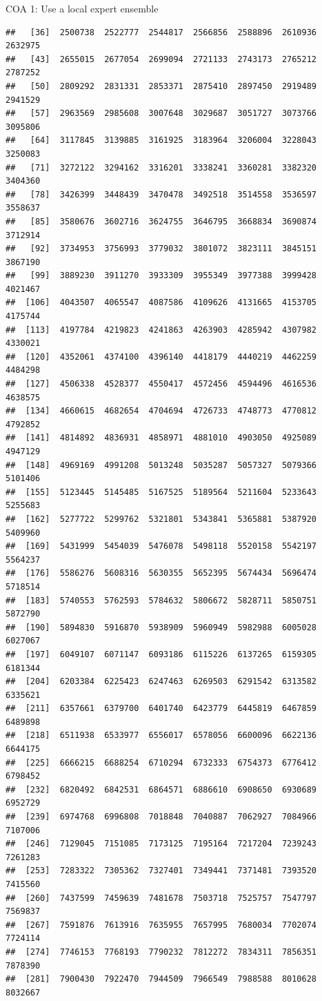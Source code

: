 \documentclass[ignorenonframetext,]{beamer}
\begin{document}
\begin{frame}[fragile]{COA 1: Use a local expert ensemble}
\begin{verbatim}
##   [36]  2500738  2522777  2544817  2566856  2588896  2610936  2632975
##   [43]  2655015  2677054  2699094  2721133  2743173  2765212  2787252
##   [50]  2809292  2831331  2853371  2875410  2897450  2919489  2941529
##   [57]  2963569  2985608  3007648  3029687  3051727  3073766  3095806
##   [64]  3117845  3139885  3161925  3183964  3206004  3228043  3250083
##   [71]  3272122  3294162  3316201  3338241  3360281  3382320  3404360
##   [78]  3426399  3448439  3470478  3492518  3514558  3536597  3558637
##   [85]  3580676  3602716  3624755  3646795  3668834  3690874  3712914
##   [92]  3734953  3756993  3779032  3801072  3823111  3845151  3867190
##   [99]  3889230  3911270  3933309  3955349  3977388  3999428  4021467
##  [106]  4043507  4065547  4087586  4109626  4131665  4153705  4175744
##  [113]  4197784  4219823  4241863  4263903  4285942  4307982  4330021
##  [120]  4352061  4374100  4396140  4418179  4440219  4462259  4484298
##  [127]  4506338  4528377  4550417  4572456  4594496  4616536  4638575
##  [134]  4660615  4682654  4704694  4726733  4748773  4770812  4792852
##  [141]  4814892  4836931  4858971  4881010  4903050  4925089  4947129
##  [148]  4969169  4991208  5013248  5035287  5057327  5079366  5101406
##  [155]  5123445  5145485  5167525  5189564  5211604  5233643  5255683
##  [162]  5277722  5299762  5321801  5343841  5365881  5387920  5409960
##  [169]  5431999  5454039  5476078  5498118  5520158  5542197  5564237
##  [176]  5586276  5608316  5630355  5652395  5674434  5696474  5718514
##  [183]  5740553  5762593  5784632  5806672  5828711  5850751  5872790
##  [190]  5894830  5916870  5938909  5960949  5982988  6005028  6027067
##  [197]  6049107  6071147  6093186  6115226  6137265  6159305  6181344
##  [204]  6203384  6225423  6247463  6269503  6291542  6313582  6335621
##  [211]  6357661  6379700  6401740  6423779  6445819  6467859  6489898
##  [218]  6511938  6533977  6556017  6578056  6600096  6622136  6644175
##  [225]  6666215  6688254  6710294  6732333  6754373  6776412  6798452
##  [232]  6820492  6842531  6864571  6886610  6908650  6930689  6952729
##  [239]  6974768  6996808  7018848  7040887  7062927  7084966  7107006
##  [246]  7129045  7151085  7173125  7195164  7217204  7239243  7261283
##  [253]  7283322  7305362  7327401  7349441  7371481  7393520  7415560
##  [260]  7437599  7459639  7481678  7503718  7525757  7547797  7569837
##  [267]  7591876  7613916  7635955  7657995  7680034  7702074  7724114
##  [274]  7746153  7768193  7790232  7812272  7834311  7856351  7878390
##  [281]  7900430  7922470  7944509  7966549  7988588  8010628  8032667

\end{verbatim}
\end{frame}
\end{document}
